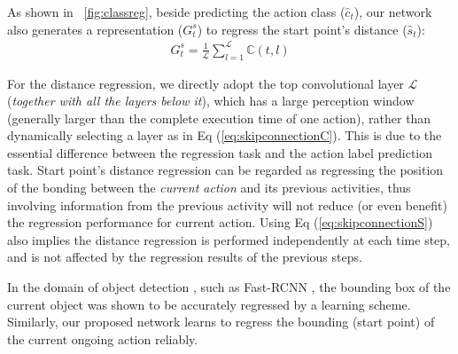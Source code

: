\documentclass[10pt,twocolumn,letterpaper]{article}
\begin{document}
As shown in \figurename{~\ref{fig:classreg}}, beside predicting the action class ($\hat{c}_{t}$),
our network also generates a representation (${G_t^s}$) to regress the start point's distance ($\hat{s}_{t}$):
\begin{eqnarray}
\label{eq:skipconnectionS}
{G_t^s} = \frac{1}{\mathcal{L}}\sum\limits_{l=1}^{\mathcal{L}}  \mathbb{C}(t,l)
\end{eqnarray}




For the distance regression, we directly adopt the top convolutional layer $\mathcal{L}$ (\emph{together with all the layers below it}),
which has a large perception window (generally larger than the complete execution time of one action),
rather than dynamically selecting a layer as in Eq (\ref{eq:skipconnectionC}).
This is due to the essential difference between the regression task and the action label prediction task.
Start point's distance regression can be regarded as regressing the position of the bonding \cite{liu2017manifold} between the \emph{current action} and its previous activities,
thus involving information from the previous activity will not reduce (or even benefit) the regression performance for current action.
Using Eq (\ref{eq:skipconnectionS}) also implies
the distance regression is performed independently at each time step,
and is not affected by the regression results of the previous steps.


In the domain of object detection \cite{lin2017feature}, such as Fast-RCNN \cite{girshick2015fast}, the bounding box of the current object was shown to be accurately regressed by a learning scheme.
Similarly, our proposed network learns to regress the bounding (start point) of the current ongoing action reliably.
\end{document}
